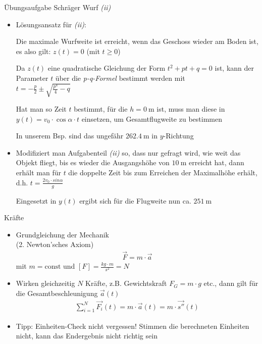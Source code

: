 \documentclass{beamer}
\begin{document}
\begin{frame}{Übungsaufgabe Schräger Wurf \emph{(ii)}}
    \begin{itemize}
    
    \item Lösungsansatz für \emph{(ii)}:
    
    Die maximale Wurfweite ist erreicht, wenn das Geschoss wieder am Boden ist, 
    es also gilt: $z (t) = 0$ (mit  $t \ge 0$)
    
    Da $z (t)$ eine quadratische Gleichung der Form $t^2 + p t + q = 0$ ist,
    kann der Parameter $t$ über die \emph{p-q-Formel} bestimmt werden mit \\
    $t = -\frac{p}{2} \pm \sqrt{\frac{p^4}{4} - q}$
    
    Hat man so Zeit $t$ bestimmt, für die $h = \SI{0}{\meter}$ ist, muss
    man diese in $y (t) = v_0 \cdot \cos \alpha \cdot t$ einsetzen, um  
    Gesamtflugweite zu bestimmen
    
    In unserem Bsp. sind das ungefähr $\SI{262.4}{\meter}$ in $y$-Richtung
    
    
    \item Modifiziert man Aufgabenteil \emph{(ii)} so, dass nur gefragt wird, wie weit das Objekt 
    fliegt, bis es wieder die Ausgangshöhe von $\SI{10}{\meter}$ erreicht hat, dann
    erhält man für $t$ die doppelte Zeit bis zum Erreichen der Maximalhöhe erhält, 
    d.h. $t = \frac{2 v_0 \cdot sin \alpha}{g}$
    
    Eingesetzt in $y (t)$ ergibt sich für die Flugweite nun ca. $\SI{251}{\meter}$
    
    \end{itemize}
    
\end{frame}

\begin{frame}{Kräfte}
    
  \begin {itemize}
    \item Grundgleichung der Mechanik \\
    (2. Newton'sches Axiom)
  \begin{align}
    \vec{F} = m \cdot \vec{a}
    \label{eq:fma}
  \end{align}
    mit $m = \text{const}$ und $[F] = \frac{kg \cdot m}{s^2} = N$
    
    \item Wirken gleichzeitig $N$ Kräfte, z.B. Gewichtskraft $F_G = m \cdot g$ etc.,
    dann gilt für die Gesamtbeschleunigung $\vec{a} (t)$
    \begin{align}
    \sum_{i=1}^{N} \vec{F_i} (t) = m \cdot \vec{a} (t) = m \cdot \vec{s''} (t)
    \end{align}
    
    \item Tipp: Einheiten-Check nicht vergessen! Stimmen die berechneten Einheiten
    nicht, kann das Endergebnis nicht richtig sein
    
    \end{itemize}
    
\end{frame}
\end{document}
